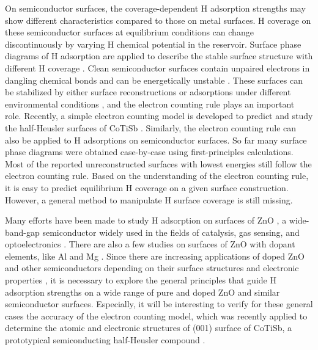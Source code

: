 On semiconductor surfaces, the coverage-dependent H adsorption strengths may show different characteristics compared to those on metal surfaces. H coverage on these semiconductor surfaces at equilibrium conditions can change discontinuously by varying H chemical potential in the reservoir. Surface phase diagrams of H adsorption are applied to describe the stable surface structure with different H coverage \cite{deWalle02GaN,wang2005hydrogen,lauritsen2011stabilization}. Clean semiconductor surfaces contain unpaired electrons in dangling chemical bonds and can be energetically unstable \cite{Harrison79, dulub2003novel,wander2001stability,hellstrom2017surface,calzolari2013dipolar}. These surfaces can be stabilized by either surface reconstructions or adsorptions under different environmental conditions \cite{Kaxiras87, meyer2004first,lauritsen2011stabilization,wahl2013stabilization,valtiner2009temperature,Jacobs16ZnO}, and the electron counting rule \cite{pashley1989electron} plays an important role. Recently, a simple electron counting model is developed to predict and study the half-Heusler surfaces of CoTiSb \cite{kawasaki2018simple}. Similarly, the electron counting rule can also be applied to H adsorptions on semiconductor surfaces. So far many surface phase diagrams were obtained case-by-case using first-principles calculations. Most of the reported unreconstructed surfaces with lowest energies \cite{meyer2004first,valtiner2009temperature,Jacobs16ZnO} still follow the electron counting rule. Based on the understanding of the electron counting rule, it is easy to predict equilibrium H coverage on a given surface construction. However, a general method to manipulate H surface coverage is still missing.

Many efforts have been made to study H adsorption on surfaces of ZnO \cite{Meyer03,meyer2004first,wang2005hydrogen,valtiner2009temperature,lauritsen2011stabilization, wahl2013stabilization, Jacobs16ZnO}, a wide-band-gap semiconductor widely used in the fields of catalysis, gas sensing, and optoelectronics \cite{Ozgur05_ZnO,Klingshirn07_ZnO}. There are also a few studies on surfaces of ZnO with dopant elements, like Al and Mg \cite{lin2009first, lahmer2015effect}. Since there are increasing applications of doped ZnO and other semiconductors depending on their surface structures and electronic properties \cite{Pan08_doped_ZnO, Georgekutty08_Ag_ZnO, lin2009first, Ling11_Sn-Doped, Buonsanti11_Al_ZnO, Kim14_doped, Hsu14_Ag_ZnO, Lin17_Ni_SnO2}, it is necessary to explore the general principles that guide H adsorption strengths on a wide range of pure and doped ZnO and similar semiconductor surfaces. Especially, it will be interesting to verify for these general cases the accuracy of the electron counting model, which was recently applied to determine the atomic and electronic structures of (001) surface of CoTiSb, a prototypical semiconducting half-Heusler compound \cite{kawasaki2018simple}.


